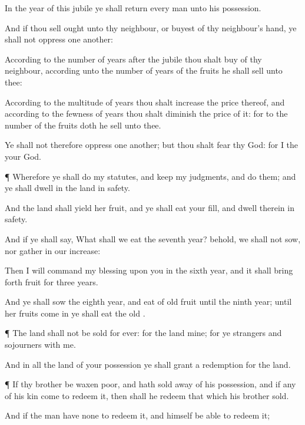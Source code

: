 {In the
year of this
jubile ye shall
return every
man unto his
possession.

And if thou
sell
ought unto thy
neighbour, or
buyest
{} of thy
neighbour’s
hand, ye shall not
oppress
one
another:

According to the
number of
years
after the
jubile thou shalt
buy of thy
neighbour,
{} according unto the
number of
years of the
fruits he shall
sell unto thee:

According to the
multitude of
years thou shalt
increase the
price thereof, and
according to the
fewness of
years thou shalt
diminish the
price of it: for
{} to the
number
{} of the
fruits doth he
sell unto thee.

Ye shall not therefore
oppress
one
another; but thou shalt
fear thy
God: for I
{} the
{} your
God.


\par }{\PP {}¶ Wherefore ye shall
do my
statutes, and
keep my
judgments, and
do them; and ye shall
dwell in the
land in
safety.

And the
land shall
yield her
fruit, and ye shall
eat your
fill, and
dwell therein in
safety.

And if ye shall
say, What shall we
eat the
seventh
year? behold, we shall not
sow, nor
gather in our
increase:

Then I will
command my
blessing upon you in the
sixth
year, and it shall bring
forth
fruit for
three
years.

And ye shall
sow the
eighth
year, and
eat
{} of
old
fruit until the
ninth
year; until her
fruits come
in ye shall
eat
{} the
old
{}.


\par }{\PP {}¶ The
land shall not be
sold for
ever: for the
land
{} mine; for ye
{}
strangers and
sojourners with me.

And in all the
land of your
possession ye shall
grant a
redemption for the
land.


\par }{\PP {}¶ If thy
brother be waxen
poor, and hath
sold away
{} of his
possession, and if any of his
kin
come to
redeem it, then shall he
redeem that which his
brother
sold.

And if the
man have none to
redeem it, and
himself be
able to
redeem it;

}
